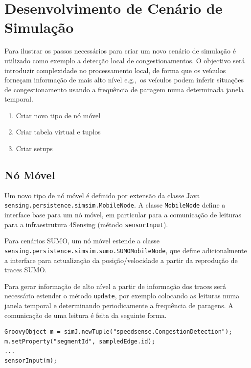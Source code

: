 \documentclass{article}
\newcommand{\eg}{e.g.,\ }
\newcommand{\tm}[1]{\texttt{#1}}
\begin{document}

\section{Desenvolvimento de Cenário de Simulação}
Para ilustrar os passos necessários para criar um novo cenário de simulação é utilizado como exemplo a detecção local de congestionamentos.
O objectivo será introduzir complexidade no processamento local, de forma que os veículos forneçam informação de mais alto nível \eg os veículos podem inferir situações de congestionamento usando a frequência de paragem numa determinada janela temporal.

\begin{enumerate}
\item Criar novo tipo de nó móvel
\item Criar tabela virtual e tuplos
\item Criar setups
\end{enumerate}

\subsection{Nó Móvel}

Um novo tipo de nó móvel é definido por extensão da classe Java \tm{sensing.persistence.simsim.MobileNode}. A classe \tm{MobileNode} define a interface base para um nó móvel, em particular para a comunicação de leituras para a infraestrutura 4Sensing (método \tm{sensorInput}).

Para cenários SUMO, um nó móvel estende a classe  \tm{sensing.persistence.simsim.sumo.SUMOMobileNode}, que define adicionalmente a interface para actualização da posição/velocidade a partir da reprodução de traces SUMO.

Para gerar informação de alto nível a partir de informação dos traces será necessário estender o método \tm{update}, por exemplo colocando as leituras numa janela temporal e determinando periodicamente a frequência de paragens. A comunicação de uma leitura é feita da seguinte forma.

\begin{Verbatim}
GroovyObject m = simJ.newTuple("speedsense.CongestionDetection"); 
m.setProperty("segmentId", sampledEdge.id); 
...
sensorInput(m);
\end{Verbatim}
\end{document}
